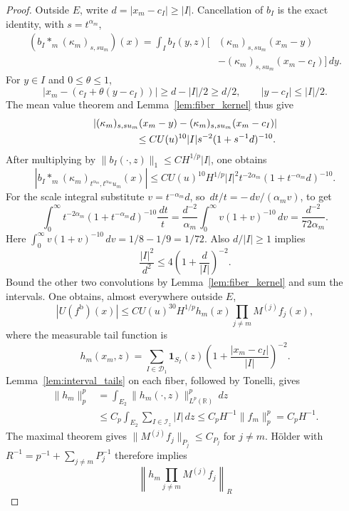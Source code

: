 \documentclass[12pt,reqno]{amsart}
\theoremstyle{plain}
\theoremstyle{definition}
\theoremstyle{remark}
\numberwithin{equation}{section}
\newcommand{\R}{\mathbb R}
\newcommand{\dd}{\,d}
\newcommand{\one}{\mathbf 1}
\begin{document}
\begin{proof}
Outside $E$, write $d=|x_m-c_I|\ge|I|$. Cancellation of $b_I$
is the exact identity, with $s=t^{\alpha_m}$,
\begin{align*}
 (b_I*_m(\kappa_m)_{s,su_m})(x)
 =\int_I b_I(y,z)\big[&(\kappa_m)_{s,su_m}(x_m-y)\\
                      &-(\kappa_m)_{s,su_m}(x_m-c_I)\big]\dd y.
\end{align*}
For $y\in I$ and $0\le\theta\le1$,
\[
 |x_m-(c_I+\theta(y-c_I))|
 \ge d-|I|/2\ge d/2,
 \qquad |y-c_I|\le|I|/2.
\]
The mean value theorem and Lemma~\ref{lem:fiber_kernel} thus give
\begin{align*}
 &|(\kappa_m)_{s,su_m}(x_m-y)
             -(\kappa_m)_{s,su_m}(x_m-c_I)|\\
 &\hspace{15mm}\le C U(u)^{10}|I|s^{-2}(1+s^{-1}d)^{-10}.
\end{align*}
After multiplying by $\|b_I(\cdot,z)\|_1\le C H^{1/p}|I|$,
one obtains
\[
 |b_I*_m(\kappa_m)_{t^{\alpha_m},t^{\alpha_m}u_m}(x)|
 \le C U(u)^{10}H^{1/p}|I|^2t^{-2\alpha_m}
                         (1+t^{-\alpha_m}d)^{-10}.
\]
For the scale integral substitute $v=t^{-\alpha_m}d$,
so $\dd t/t=-\dd v/(\alpha_m v)$, to get
\[
 \int_0^\infty t^{-2\alpha_m}(1+t^{-\alpha_m}d)^{-10}
                  \frac{\dd t}{t}
 =\frac{d^{-2}}{\alpha_m}\int_0^\infty v(1+v)^{-10}\dd v
 =\frac{d^{-2}}{72\alpha_m}.
\]
Here $\int_0^\infty v(1+v)^{-10}\dd v=1/8-1/9=1/72$.
Also $d/|I|\ge1$ implies
\[
 \frac{|I|^2}{d^2}
 \le4\left(1+\frac d{|I|}\right)^{-2}.
\]
Bound the other two convolutions by Lemma~\ref{lem:fiber_kernel}
and sum the intervals. One obtains, almost everywhere outside $E$,
\begin{equation}\label{eq:cz_bad_pointwise}
 |U(f^{\mathrm b})(x)|
 \le C U(u)^{30}H^{1/p}h_m(x)\prod_{j\ne m}M^{(j)}f_j(x),
\end{equation}
where the measurable tail function is
\[
 h_m(x_m,z)=\sum_{I\in\mathcal D_1}\one_{S_I}(z)
       \left(1+\frac{|x_m-c_I|}{|I|}\right)^{-2}.
\]
Lemma~\ref{lem:interval_tails} on each fiber, followed by Tonelli,
gives
\begin{align*}
 \|h_m\|_p^p
 &=\int_{E_2}\|h_m(\cdot,z)\|_{L^p(\R)}^p\dd z\\
 &\le C_p\int_{E_2}\sum_{I\in\mathcal I_z}|I|\dd z
 \le C_pH^{-1}\|f_m\|_p^p=C_pH^{-1}.
\end{align*}
The maximal theorem gives
$\|M^{(j)}f_j\|_{P_j}\le C_{P_j}$ for $j\ne m$.
H\"older with $R^{-1}=p^{-1}+\sum_{j\ne m}P_j^{-1}$ therefore
implies
\[
 \left\|h_m\prod_{j\ne m}M^{(j)}f_j\right\|_R
\]
\end{proof}
\end{document}
